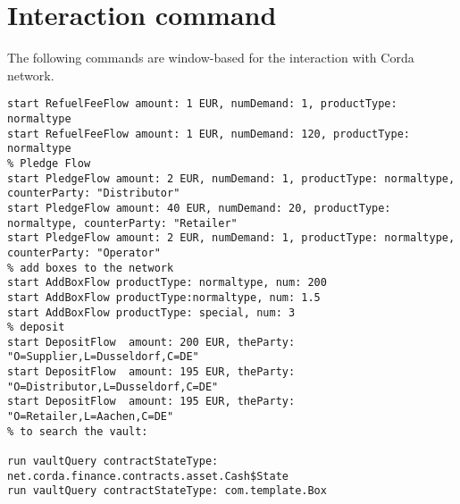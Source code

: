 \section{Interaction command}
The following commands are window-based for the interaction with Corda network.
\begin{lstlisting}[caption={Scenario 1}, label={lst:scenario 1}]
% RefuelFeeFlow
start RefuelFeeFlow amount: 1 EUR, numDemand: 1, productType: normaltype
start RefuelFeeFlow amount: 1 EUR, numDemand: 120, productType: normaltype
% Pledge Flow
start PledgeFlow amount: 2 EUR, numDemand: 1, productType: normaltype, counterParty: "Distributor"
start PledgeFlow amount: 40 EUR, numDemand: 20, productType: normaltype, counterParty: "Retailer"
start PledgeFlow amount: 2 EUR, numDemand: 1, productType: normaltype, counterParty: "Operator"
% add boxes to the network
start AddBoxFlow productType: normaltype, num: 200
start AddBoxFlow productType:normaltype, num: 1.5
start AddBoxFlow productType: special, num: 3
% deposit
start DepositFlow  amount: 200 EUR, theParty: "O=Supplier,L=Dusseldorf,C=DE"
start DepositFlow  amount: 195 EUR, theParty: "O=Distributor,L=Dusseldorf,C=DE"
start DepositFlow  amount: 195 EUR, theParty: "O=Retailer,L=Aachen,C=DE"
% to search the vault:

run vaultQuery contractStateType: net.corda.finance.contracts.asset.Cash$State
run vaultQuery contractStateType: com.template.Box

\end{lstlisting}

